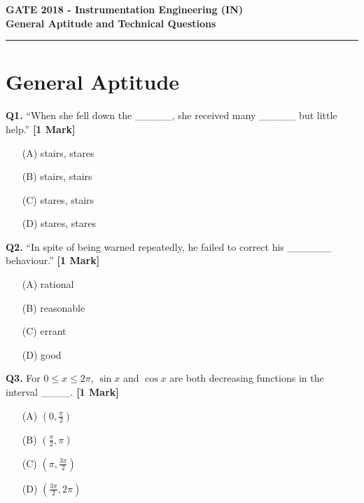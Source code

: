 \documentclass[11pt]{article}
\newcommand{\questiona}[2]{
    \noindent\textbf{Q#2.} #1 \hfill \textbf{[1 Mark]}
}
\begin{document}
\begin{center}
    \Large\textbf{GATE 2018 - Instrumentation Engineering (IN)} \\
    \large\textbf{General Aptitude and Technical Questions} \\
    \rule{\textwidth}{0.5pt} %
\end{center}

\vspace{0.5cm}

\section*{General Aptitude}

\questiona{“When she fell down the \_\_\_\_\_, she received many \_\_\_\_\_ but little help.”}{1}
\begin{enumerate}
    \item[(A)] stairs, stares
    \item[(B)] stairs, stairs
    \item[(C)] stares, stairs
    \item[(D)] stares, stares
\end{enumerate}
\vspace{0.5cm}

\questiona{“In spite of being warned repeatedly, he failed to correct his \_\_\_\_\_\_ behaviour.”}{2}
\begin{enumerate}
    \item[(A)] rational
    \item[(B)] reasonable
    \item[(C)] errant
    \item[(D)] good
\end{enumerate}
\vspace{0.5cm}

\questiona{For \(0 \leq x \leq 2\pi\), \(\sin x\) and \(\cos x\) are both decreasing functions in the interval \_\_\_\_.}{3}
\begin{enumerate}
    \item[(A)] \((0, \frac{\pi}{2})\)
    \item[(B)] \((\frac{\pi}{2}, \pi)\)
    \item[(C)] \((\pi, \frac{3\pi}{2})\)
    \item[(D)] \((\frac{3\pi}{2}, 2\pi)\)
\end{enumerate}
\vspace{0.5cm}
\end{document}
